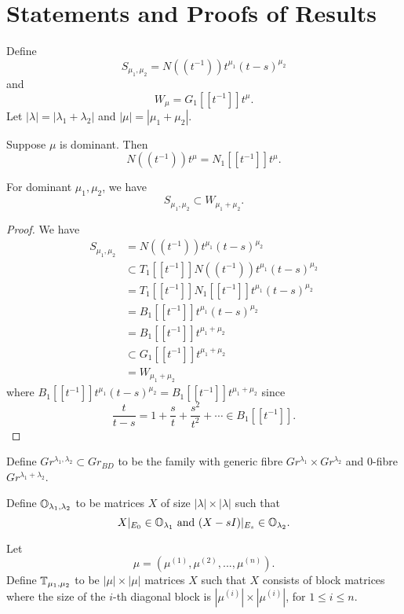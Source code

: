 \documentclass{article}
\begin{document}
\section{Statements and Proofs of Results}
Define
\[
S_{\mu_1, \mu_2} = N((t^{-1}))t^{\mu_1}(t-s)^{\mu_2}
\]
and
\[
W_\mu = G_1 [[t^{-1}]]t^\mu.
\]
Let $|\lambda| = |\lambda_1 + \lambda_2|$ and $|\mu| = |\mu_1 + \mu_2|$.

\begin{lemma}
Suppose $\mu$ is dominant. Then 
\[
N((t^{-1})) t^\mu = N_1[[t^{-1}]] t^\mu.
\]
\end{lemma}

\begin{lemma}
For dominant $\mu_1,\mu_2$, we have
\[
S_{\mu_1, \mu_2} \subset W_{\mu_1 + \mu_2}.
\]
\end{lemma}

\begin{proof}
We have
\[
\begin{split}
    S_{\mu_1, \mu_2} & = N((t^{-1}))t^{\mu_1}(t-s)^{\mu_2} \\
     & \subset T_1[[t^{-1}]] N((t^{-1})) t^{\mu_1} (t-s)^{\mu_2} \\
     & = T_1[[t^{-1}]] N_1[[t^{-1}]] t^{\mu_1} (t-s)^{\mu_2} \\
     & = B_1[[t^{-1}]] t^{\mu_1} (t-s)^{\mu_2} \\
     & = B_1[[t^{-1}]] t^{\mu_1 + \mu_2} \\
     & \subset G_1[[t^{-1}]] t^{\mu_1 + \mu_2} \\
     & = W_{\mu_1 + \mu_2}
\end{split}
\]
where $B_1[[t^{-1}]] t^{\mu_1} (t-s)^{\mu_2} = B_1[[t^{-1}]] t^{\mu_1 + \mu_2}$ since 
\[
\frac{t}{t-s} = 
1 + \frac{s}{t} + \frac{s^2}{t^2} + \cdots 
\in B_1[[t^{-1}]].
\]
\end{proof}

Define $Gr^{\lambda_1, \lambda_2} \subset Gr_{BD}$ to be the family with generic fibre $Gr^{\lambda_1} \times Gr^{\lambda_2}$ and 0-fibre $Gr^{\lambda_1 + \lambda_2}$.

Define $\mathbb O_{\lambda_1, \lambda_2}$ to be matrices $X$ of size $|\lambda| \times |\lambda|$ such that 
\[
X|_{E_0} \in \mathbb O_{\lambda_1} \text{ and } (X-sI)|_{E_s} \in \mathbb O_{\lambda_2}.
\]

Let 
\[
\mu = (\mu^{(1)}, \mu^{(2)}, ..., \mu^{(n)}).
\]
Define $\mathbb T_{\mu_1, \mu_2}$ to be $|\mu| \times |\mu|$ matrices $X$ such that $X$ consists of block matrices where the size of the $i$-th diagonal block is $|\mu^{(i)}| \times |\mu^{(i)}|$, for $1\leq i \leq n$.
\end{document}
